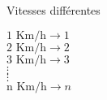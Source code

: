 \documentclass[12pt]{beamer}
\begin{document}
\begin{frame}{Vitesses différentes}
    \begin{center}
    
        $\text{1 Km/h} \longrightarrow 1$\\
        \vspace{0.5cm}
        $\text{2 Km/h} \longrightarrow 2$\\
        \vspace{0.5cm}
        $\text{3 Km/h} \longrightarrow 3$\\
        \Huge $\vdots$\\
        \Huge $\vdots$\\
        \vspace{0.5cm}
        \normalsize{$\text{n Km/h} \longrightarrow n$\\}
    \end{center}
\end{frame}
\end{document}
